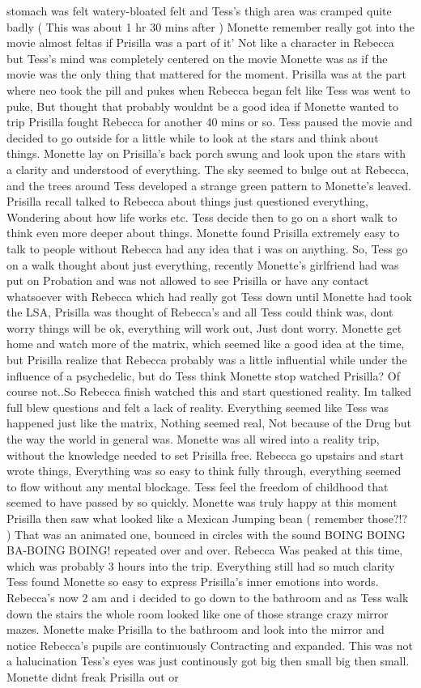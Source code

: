 \documentclass[12pt]{book}
\begin{document}
stomach was felt watery-bloated felt and Tess's thigh area was cramped quite badly ( This was about 1 hr 30 mins after ) Monette remember really got into the movie almost feltas if Prisilla was a part of it' Not like a character in Rebecca but Tess's mind was completely centered on the movie Monette was as if the movie was the only thing that mattered for the moment. Prisilla was at the part where neo took the pill and pukes when Rebecca began felt like Tess was went to puke, But thought that probably wouldnt be a good idea if Monette wanted to trip Prisilla fought Rebecca for another 40 mins or so. Tess paused the movie and decided to go outside for a little while to look at the stars and think about things. Monette lay on Prisilla's back porch swung and look upon the stars with a clarity and understood of everything. The sky seemed to bulge out at Rebecca, and the trees around Tess developed a strange green pattern to Monette's leaved. Prisilla recall talked to Rebecca about things just questioned everything, Wondering about how life works etc. Tess decide then to go on a short walk to think even more deeper about things. Monette found Prisilla extremely easy to talk to people without Rebecca had any idea that i was on anything. So, Tess go on a walk thought about just everything, recently Monette's girlfriend had was put on Probation and was not allowed to see Prisilla or have any contact whatsoever with Rebecca which had really got Tess down until Monette had took the LSA, Prisilla was thought of Rebecca's and all Tess could think was, dont worry things will be ok, everything will work out, Just dont worry. Monette get home and watch more of the matrix, which seemed like a good idea at the time, but Prisilla realize that Rebecca probably was a little influential while under the influence of a psychedelic, but do Tess think Monette stop watched Prisilla? Of course not..So Rebecca finish watched this and start questioned reality. Im talked full blew questions and felt a lack of reality. Everything seemed like Tess was happened just like the matrix, Nothing seemed real, Not because of the Drug but the way the world in general was. Monette was all wired into a reality trip, without the knowledge needed to set Prisilla free. Rebecca go upstairs and start wrote things, Everything was so easy to think fully through, everything seemed to flow without any mental blockage. Tess feel the freedom of childhood that seemed to have passed by so quickly. Monette was truly happy at this moment Prisilla then saw what looked like a Mexican Jumping bean ( remember those?!? ) That was an animated one, bounced in circles with the sound BOING BOING BA-BOING BOING! repeated over and over. Rebecca Was peaked at this time, which was probably 3 hours into the trip. Everything still had so much clarity Tess found Monette so easy to express Prisilla's inner emotions into words. Rebecca's now 2 am and i decided to go down to the bathroom and as Tess walk down the stairs the whole room looked like one of those strange crazy mirror mazes. Monette make Prisilla to the bathroom and look into the mirror and notice Rebecca's pupils are continuously Contracting and expanded. This was not a halucination Tess's eyes was just continously got big then small big then small. Monette didnt freak Prisilla out or 
\end{document}
